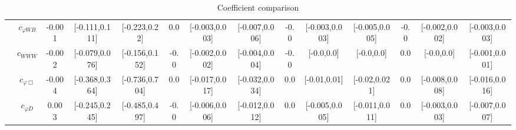 \documentclass{article}
\begin{document}
\begin{table}[H]
\begin{tabular}{|c|c|c|c|c|c|c|c|c|c|c|c|c|c|}
 & $c_{\varphi WB}$ & -0.001                             & [-0.111,0.111]                                 & [-0.223,0.22] & 0.0                             & [-0.003,0.003]                                 & [-0.007,0.006] & -0.0                             & [-0.003,0.003]                                 & [-0.005,0.005] & -0.0                             & [-0.002,0.002]                                 & [-0.003,0.003] \\ \cline{2-14}
 & $c_{WWW}$ & -0.002                             & [-0.079,0.076]                                 & [-0.156,0.152] & -0.0                             & [-0.002,0.002]                                 & [-0.004,0.004] & -0.0                             & [-0.0,0.0]                                 & [-0.0,0.0] & 0.0                             & [-0.0,0.0]                                 & [-0.001,0.001] \\ \cline{2-14}
 & $c_{\varphi \Box}$ & -0.004                             & [-0.368,0.364]                                 & [-0.736,0.704] & 0.0                             & [-0.017,0.017]                                 & [-0.032,0.034] & 0.0                             & [-0.01,0.01]                                 & [-0.02,0.021] & 0.0                             & [-0.008,0.008]                                 & [-0.016,0.016] \\ \cline{2-14}
 & $c_{\varphi D}$ & 0.003                             & [-0.245,0.245]                                 & [-0.485,0.497] & -0.0                             & [-0.006,0.006]                                 & [-0.012,0.012] & 0.0                             & [-0.005,0.005]                                 & [-0.011,0.011] & 0.0                             & [-0.003,0.003]                                 & [-0.007,0.007] \\ \cline{2-14}
\hline
\end{tabular}
\caption{Coefficient comparison}
\end{table}
\end{document}
